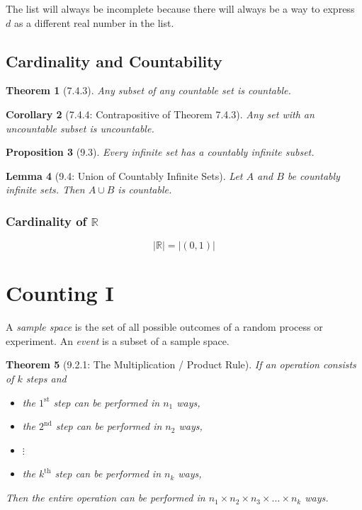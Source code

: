 \documentclass{article}
\theoremstyle{plain}
\newtheorem{theorem}{Theorem}[section]
\newtheorem{lemma}[theorem]{Lemma}
\newtheorem{corollary}[theorem]{Corollary}
\newtheorem{proposition}[theorem]{Proposition}
\theoremstyle{definition}
\theoremstyle{remark}
\begin{document}
The list will always be incomplete because there will always be a way to express $d$ as a different real number in the list.

\subsection{Cardinality and Countability}

\begin{theorem}[7.4.3]
    Any subset of any countable set is countable.
\end{theorem}

\begin{corollary}[7.4.4: Contrapositive of Theorem 7.4.3]
    Any set with an uncountable subset is uncountable.
\end{corollary}

\begin{proposition}[9.3]
    Every infinite set has a countably infinite subset.
\end{proposition}

\begin{lemma}[9.4: Union of Countably Infinite Sets]
    Let $A$ and $B$ be countably infinite sets. Then $A \cup B$ is countable.
\end{lemma}

\subsubsection*{Cardinality of $\mathbb{R}$}
\[ |\mathbb{R}| = |(0,1)| \]

\section{Counting I}

A \emph{sample space} is the set of all possible outcomes of a random process or experiment. An \emph{event} is a subset of a sample space.

\begin{theorem}[9.2.1: The Multiplication / Product Rule]
    If an operation consists of $k$ steps and
    \begin{itemize}
        \item the $1^{\text{st}}$ step can be performed in $n_1$ ways,
        \item the $2^{\text{nd}}$ step can be performed in $n_2$ ways,
        \item $\vdots$
        \item the $k^{\text{th}}$ step can be performed in $n_k$ ways,
    \end{itemize}
    Then the entire operation can be performed in $n_1 \times n_2 \times n_3 \times \dots \times n_k$ ways.
\end{theorem}
\end{document}
